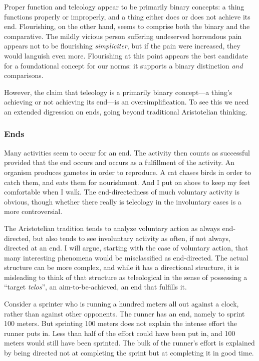 Proper function and teleology appear to be primarily binary concepts: a thing functions properly or improperly, and a thing either 
does or does not achieve its end. Flourishing, on the other hand, seems to comprise both the binary and the comparative. The mildly vicious person suffering undeserved horrendous pain appears not to be flourishing \textit{simpliciter}, but if the pain 
were increased,
they would languish even more. Flourishing at this point appears the best candidate for a foundational concept for our norms: it supports a binary distinction \textit{and} comparisons.

However, the claim that teleology is a primarily binary concept---a thing's achieving or not achieving its end---is
an oversimplification. To see this we need an extended digression on ends, going beyond traditional Aristotelian
thinking.

\subsubsection{Ends}
Many activities seem to occur for an end. The activity then counts as successful provided that the end occurs and occurs as a
fulfillment of the activity. An organism produces gametes in order to reproduce. A cat chases birds in order to catch them,
and eats them for nourishment. And I put on shoes to keep my feet comfortable when I walk. The end-directedness of much voluntary
activity is obvious, though whether there really is teleology in the involuntary cases is a more controversial.

The Aristotelian tradition tends to analyze voluntary action as always end-directed, but also tends to see involuntary activity as 
often, if not always, directed at an end. I will argue, starting with the case of voluntary action, that many interesting phenomena 
would be misclassified as end-directed. The actual structure can be more complex, and while it has a directional structure, it is
misleading to think of that structure as teleological in the sense of possessing a ``target \textit{telos}'', an aim-to-be-achieved,
an end that fulfills it.

Consider a sprinter who is running a hundred meters all out against a clock, rather than against other opponents. The runner has an end, 
namely to sprint 100 meters. But sprinting 100 meters does not explain the intense effort the runner puts in. Less than half of the effort 
could have been put in, and 100 meters would still have been sprinted. The bulk of the runner's effort is explained by being directed 
not at completing the sprint but at completing it in good time.

